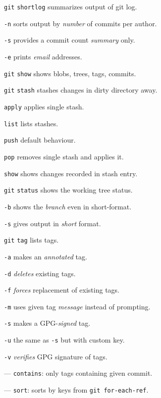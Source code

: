 \documentclass{reference_card}
\begin{document}
\begin{multicols*}{3}
\begin{compactenum}
\item [\texttt{git}] \texttt{shortlog} summarizes output of git log.
\item [\texttt{-n}] sorts output by \emph{number} of commits per author.
\item [\texttt{-s}] provides a commit count \emph{summary} only.
\item [\texttt{-e}] prints \emph{email} addresses.
\end{compactenum}

\begin{compactenum}
\item [\texttt{git}] \texttt{show} shows blobs, trees, tags, commits.
\end{compactenum}

\begin{compactenum}
\item [\texttt{git}] \texttt{stash} stashes changes in dirty directory away.
\item [\scriptsize \texttt{apply}] applies single stash.
\item [\scriptsize \texttt{list}] lists stashes.
\item [\scriptsize \texttt{push}] default behaviour.
\item [\scriptsize \texttt{pop}] removes single stash and applies it.
\item [\scriptsize \texttt{show}] shows changes recorded in stash entry.
\end{compactenum}

\begin{compactenum}
\item [\texttt{git}] \texttt{status} shows the working tree status.
\item [\texttt{-b}] shows the \emph{branch} even in short-format.
\item [\texttt{-s}] gives output in \emph{short} format.
\end{compactenum}

\begin{compactenum}
\item [\texttt{git}] \texttt{tag} lists tags.
\item [\texttt{-a}] makes an \emph{annotated} tag.
\item [\texttt{-d}] \emph{deletes} existing tags.
\item [\texttt{-f}] \emph{forces} replacement of existing tags.
\item [\texttt{-m}] uses given tag \emph{message} instead of prompting.
\item [\texttt{-s}] makes a GPG-\emph{signed} tag.
\item [\texttt{-u}] the same as \texttt{-s} but with custom key.
\item [\texttt{-v}] \emph{verifies} GPG signature of tags.
\item [---] \texttt{contains}: only tags containing given commit.
\item [---] \texttt{sort}: sorts by keys from \texttt{git for-each-ref}.
\end{compactenum}


\end{multicols*}
\end{document}
